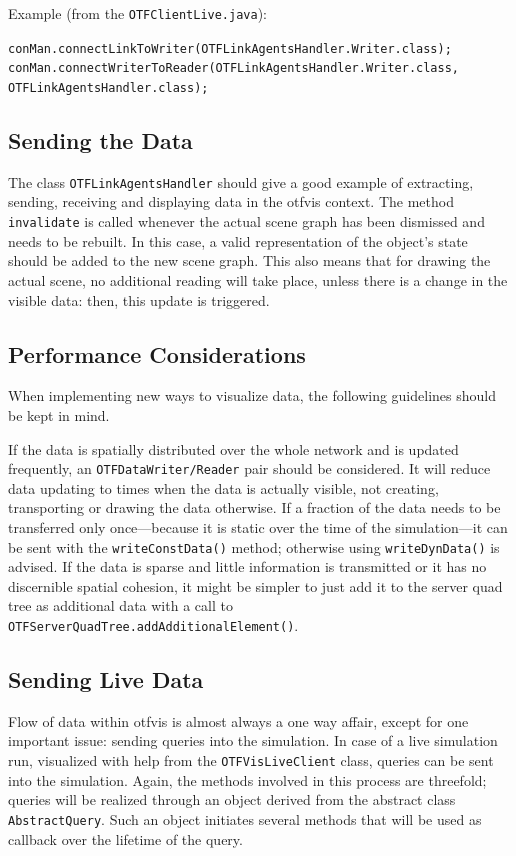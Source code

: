 Example (from the \lstinline|OTFClientLive.java|):

\lstinline|conMan.connectLinkToWriter(OTFLinkAgentsHandler.Writer.class);| \\
\lstinline|conMan.connectWriterToReader(OTFLinkAgentsHandler.Writer.class,|
\lstinline|OTFLinkAgentsHandler.class);|

\subsection{Sending the Data}
The class \lstinline|OTFLinkAgentsHandler| should give a good example of extracting, sending, receiving and displaying data in the \gls{otfvis} context. The method \lstinline|invalidate| is called whenever the actual scene graph has been dismissed and needs to be rebuilt. 
In this case, a valid representation of the object's state should be added to the new scene graph. 
This also means that for drawing the actual scene, no additional reading will take place, unless 
there is a change in the visible data: then, this update is triggered.

\subsection{Performance Considerations}
When implementing new ways to visualize data, the following guidelines should be kept in mind.

If the data is spatially distributed over the whole network and is updated frequently, an \lstinline|OTFDataWriter/Reader| pair should be considered. 
It will reduce data updating to times when the data is actually visible, not creating, transporting or drawing the data otherwise. If a fraction of the data needs to be transferred only once---because it is static over the time of the simulation---it can be sent with the \lstinline|writeConstData()| method; otherwise using \lstinline|writeDynData()| is advised. 
If the data is sparse and little information is transmitted or it has no discernible spatial cohesion, it might be simpler to just add it to the server quad tree as additional data with a call to \lstinline|OTFServerQuadTree.addAdditionalElement()|. 

\subsection{Sending Live Data}
Flow of data within \gls{otfvis} is almost always a one way affair, 
except for one important issue: sending queries into the simulation. In case of a live simulation run, visualized with help from the \lstinline|OTFVisLiveClient| class, queries can be sent into the simulation. 
Again, the methods involved in this process are threefold; queries will be realized through an object derived from the abstract class \lstinline|AbstractQuery|. Such an object initiates several methods that will be used as callback over the lifetime of the query.

